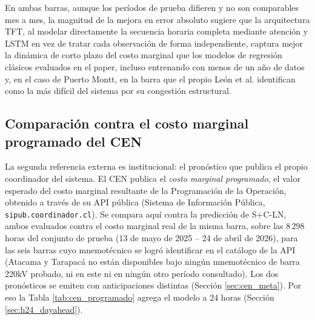 En ambas barras, aunque los períodos de prueba difieren y no son comparables mes a mes, la magnitud de la mejora en error absoluto sugiere que la arquitectura TFT, al modelar directamente la secuencia horaria completa mediante atención y LSTM en vez de tratar cada observación de forma independiente, captura mejor la dinámica de corto plazo del costo marginal que los modelos de regresión clásicos evaluados en el paper, incluso entrenando con menos de un año de datos y, en el caso de Puerto Montt, en la barra que el propio León et al. identifican como la más difícil del sistema por su congestión estructural.

\subsection{Comparación contra el costo marginal programado del CEN}
\label{sec:cen_programado}

La segunda referencia externa es institucional: el pronóstico que publica el propio coordinador del sistema. El CEN publica el \textit{costo marginal programado}, el valor esperado del costo marginal resultante de la Programación de la Operación, obtenido a través de su API pública (Sistema de Información Pública, \texttt{sipub.coordinador.cl}). Se compara aquí contra la predicción de S+C-LN, ambos evaluados contra el costo marginal real de la misma barra, sobre las 8\,298 horas del conjunto de prueba (13 de mayo de 2025 -- 24 de abril de 2026), para las seis barras cuyo mnemotécnico se logró identificar en el catálogo de la API (Atacama y Tarapacá no están disponibles bajo ningún mnemotécnico de barra 220kV probado, ni en este ni en ningún otro período consultado). Los dos pronósticos se emiten con anticipaciones distintas (Sección \ref{sec:cen_meta}). Por eso la Tabla \ref{tab:cen_programado} agrega el modelo a 24 horas (Sección \ref{sec:h24_dayahead}).

